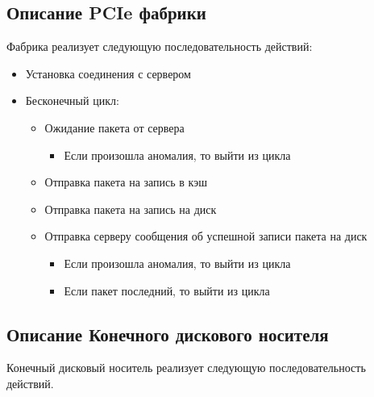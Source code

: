 \subsection{Описание PCIe фабрики }

Фабрика реализует следующую последовательность действий: 

\begin{itemize}
\item Установка соединения с сервером
\item Бесконечный цикл:
	\begin{itemize}
		\item Ожидание пакета от сервера
		\begin{itemize}
			\item Если произошла аномалия, то выйти из цикла
		\end{itemize}
		
		\item Отправка пакета на запись в кэш
		\item Отправка пакета на запись на диск		
		\item  Отправка серверу сообщения об успешной записи пакета на диск 
		\begin{itemize}
			\item Если произошла аномалия, то выйти из цикла
		\end{itemize}
		\begin{itemize}
			\item Если пакет последний, то выйти из цикла
		\end{itemize}
	\end{itemize}
\end{itemize}

\subsection{Описание Конечного дискового носителя}

Конечный дисковый носитель реализует следующую последовательность действий.

